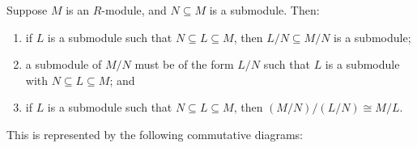\begin{theorem}\label{thm:iso-3-mod}
    Suppose \(M\) is an \(R\)-module,
    and \(N \subseteq M\) is a submodule.
    Then:
    \begin{enumerate}[label={(\alph*)}, itemsep=0mm]
        \item if \(L\) is a submodule such that \(N \subseteq L \subseteq M\),
            then \(L/N \subseteq M/N\) is a submodule;
        \item a submodule of \(M/N\) must be of the form \(L/N\)
            such that \(L\) is a submodule with \(N \subseteq L \subseteq M\); and
        \item if \(L\) is a submodule such that \(N \subseteq L \subseteq M\),
            then \((M/N)/(L/N) \cong M/L\).
    \end{enumerate}

    This is represented by the following commutative diagrams:
    \begin{center}
    \end{center}
\end{theorem}
